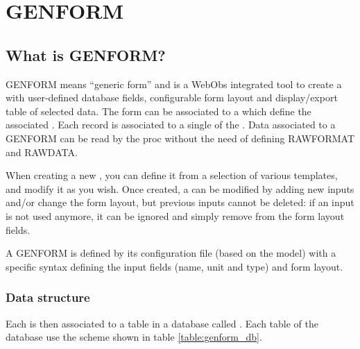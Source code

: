 
\section{GENFORM} \label{genform}


\subsection{What is GENFORM?}

GENFORM means “generic form” and is a WebObs integrated tool to create a  with user-defined database fields, configurable form layout and display/export table of selected data. The form can be associated to a  which define the associated . Each record is associated to a single  of the . Data associated to a GENFORM can be read by the proc without the need of defining RAWFORMAT and RAWDATA.

When creating a new , you can define it from a selection of various templates, and modify it as you wish. Once created, a  can be modified by adding new inputs and/or change the form layout, but previous inputs cannot be deleted: if an input is not used anymore, it can be ignored and simply remove from the form layout fields.

A GENFORM is defined by its configuration file (based on the  model) with a specific syntax defining the input fields (name, unit and type) and form layout.


\subsubsection{Data structure}

Each  is then associated to a table in a database called . Each table of the database use the scheme shown in table \ref{table:genform_db}.


